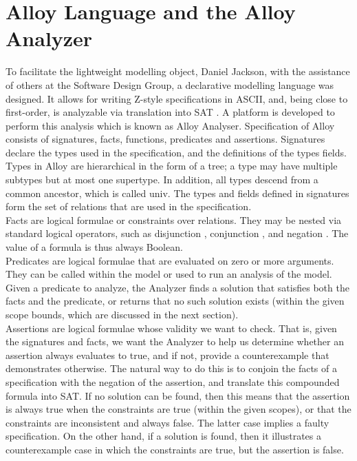 \documentclass[a4paper,12pt]{extarticle}
\begin{document}
\section{Alloy Language and the Alloy Analyzer}
\label{Alloy and its Analyzer}
To facilitate the lightweight modelling object, Daniel Jackson, with the    assistance of others at the Software Design Group, a declarative modelling language was designed. It allows for writing Z-style specifications in ASCII, and, being close to first-order, is analyzable via translation into SAT . A platform is developed to perform this analysis which is known as Alloy Analyser.
Specification of Alloy consists of signatures, facts, functions, predicates and assertions. 
Signatures declare the types used in the specification, and the definitions of the types fields. Types in Alloy are hierarchical in the form of a tree; a type may have multiple subtypes but at most one supertype. In addition, all types descend from a common ancestor, which is called univ. The types and fields defined in signatures form the set of relations that are used in the specification. \\
Facts are logical formulae or constraints over relations. They may be nested via standard logical operators, such as disjunction , conjunction , and negation . The value of a formula is thus always Boolean. \\
Predicates are logical formulae that are evaluated on zero or more arguments. They can be called within the model or used to run an analysis of the model. Given a predicate to analyze, the Analyzer finds a solution that satisfies both the facts and the predicate, or returns that no such solution exists (within the given scope bounds, which are discussed in the next section). \\
Assertions are logical formulae whose validity we want to check. That is, given the signatures and facts, we want the Analyzer to help us determine whether an assertion always evaluates to true, and if not, provide a counterexample that demonstrates otherwise. The natural way to do this is to conjoin the facts of a specification with the negation of the assertion, and translate this compounded formula into SAT. If no solution can be found, then this means that the assertion is always true when the constraints are true (within the given scopes), or that the constraints are inconsistent and always false. The latter case implies a faulty specification. On the other hand, if a solution is found, then it illustrates a counterexample case in which the constraints are true, but the assertion is false. 
\end{document}

